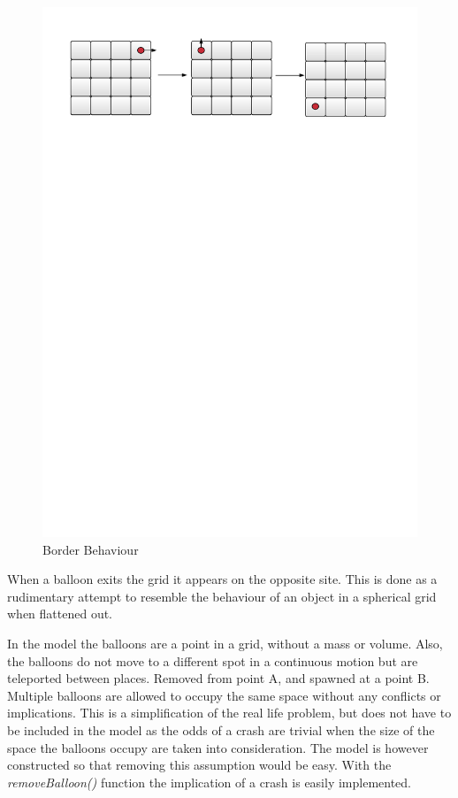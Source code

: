 \begin{figure}[H]
    \centering
    \includegraphics[width=\textwidth, trim=1cm 22cm 1cm 1cm, clip]{graphics/borderBehaviour.pdf}
    \caption{Border Behaviour}
    \label{fig:bb}
\end{figure}

When a balloon exits the grid it appears on the opposite site. This is done as a rudimentary attempt to resemble the behaviour of an object in a spherical grid when flattened out. 

In the model the balloons are a point in a grid, without a mass or volume. Also, the balloons do not move to a different spot in a continuous motion but are teleported between places. Removed from point A, and spawned at a point B. Multiple balloons are allowed to occupy the same space without any conflicts or implications. This is a simplification of the real life problem, but does not have to be included in the model as the odds of a crash are trivial when the size of the space the balloons occupy are taken into consideration. The model is however constructed so that removing this assumption would be easy. With the \textit{removeBalloon()} function the implication of a crash is easily implemented.

